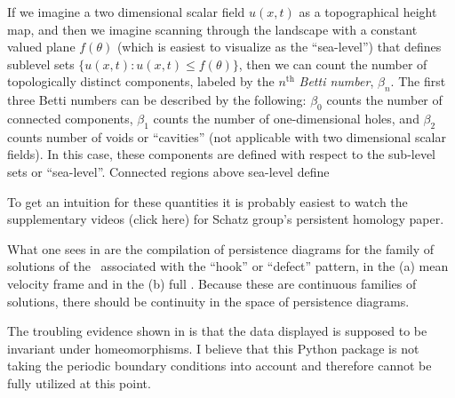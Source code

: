 \begin{description}
{\begin{description}
If we imagine a two
dimensional scalar field $u(x,t)$ as a topographical height map, and then we imagine scanning through
the landscape with a constant valued plane $f(\theta)$ (which is easiest to visualize as the ``sea-level'')
that defines sublevel sets $\{u(x,t) : u(x,t) \leq f(\theta)\}$, then we can count the number
of topologically distinct components, labeled by the $n^{\text{th}}$ \emph{Betti number}, $\beta_n$.
The first three Betti numbers can be described by the following: $\beta_0$ counts the number of connected components,
$\beta_1$ counts the number of one-dimensional holes, and $\beta_2$ counts number of voids or ``cavities''
(not applicable with two dimensional scalar fields). In this case, these components are defined with respect to the
sub-level sets or ``sea-level''. Connected regions above sea-level define

To get an intuition for these quantities it is probably easiest to watch the
supplementary videos
{(click here)} for Schatz group's persistent homology paper.

What one sees in  are the compilation of persistence diagrams for the family of solutions
of the \KSe\ associated with the ``hook'' or ``defect'' pattern, in the
(a) mean velocity frame and in the
(b) full \statesp.
Because these are continuous families of solutions, there should be continuity in the space of persistence diagrams.

The troubling evidence shown in  is that the data displayed is supposed to be invariant under
homeomorphisms. I believe that this Python package is not taking the periodic boundary conditions into
account and therefore cannot be fully utilized at this point.

\end{description}
}

\end{description}
